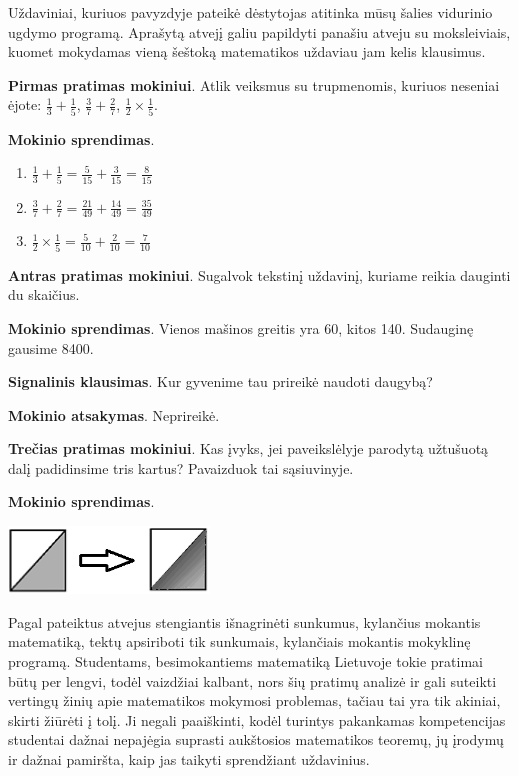 \documentclass{article}
\begin{document}
Uždaviniai, kuriuos pavyzdyje pateikė dėstytojas atitinka mūsų šalies vidurinio ugdymo programą. Aprašytą atvejį galiu papildyti panašiu atveju su moksleiviais, kuomet mokydamas vieną šeštoką matematikos uždaviau jam kelis klausimus.

\begin{framed}
\textbf{Pirmas pratimas mokiniui}. Atlik veiksmus su trupmenomis, kuriuos neseniai ėjote: $\frac{1}{3}+\frac{1}{5}$, $\frac{3}{7}+\frac{2}{7}$, $\frac{1}{2}\times \frac{1}{5}$.

\textbf{Mokinio sprendimas}.

\begin{enumerate}
\item $\frac{1}{3}+\frac{1}{5}=\frac{5}{15}+\frac{3}{15}=\frac{8}{15}$
\item $\frac{3}{7}+\frac{2}{7}=\frac{21}{49}+\frac{14}{49}=\frac{35}{49}$
\item $\frac{1}{2}\times \frac{1}{5}=\frac{5}{10}+ \frac{2}{10}=\frac{7}{10}$
\end{enumerate}

\textbf{Antras pratimas mokiniui}. Sugalvok tekstinį uždavinį, kuriame reikia dauginti du skaičius.

\textbf{Mokinio sprendimas}. Vienos mašinos greitis yra 60, kitos 140. Sudauginę gausime 8400.

\textbf{Signalinis klausimas}. Kur gyvenime tau prireikė naudoti daugybą?

\textbf{Mokinio atsakymas}. Neprireikė.

\textbf{Trečias pratimas mokiniui}. Kas įvyks, jei paveikslėlyje parodytą užtušuotą dalį padidinsime tris kartus? Pavaizduok tai sąsiuvinyje.

\textbf{Mokinio sprendimas}.

\includegraphics[width=0.4\textwidth]{density.png}
\end{framed}

Pagal pateiktus atvejus stengiantis išnagrinėti sunkumus, kylančius mokantis matematiką, tektų apsiriboti tik sunkumais, kylančiais mokantis mokyklinę programą. Studentams, besimokantiems matematiką Lietuvoje tokie pratimai būtų per lengvi, todėl vaizdžiai kalbant, nors šių pratimų analizė ir gali suteikti vertingų žinių apie matematikos mokymosi problemas, tačiau tai yra tik akiniai, skirti žiūrėti į tolį. Ji negali paaiškinti, kodėl turintys pakankamas kompetencijas studentai dažnai nepajėgia suprasti aukštosios matematikos teoremų, jų įrodymų ir dažnai pamiršta, kaip jas taikyti sprendžiant uždavinius.
\end{document}
